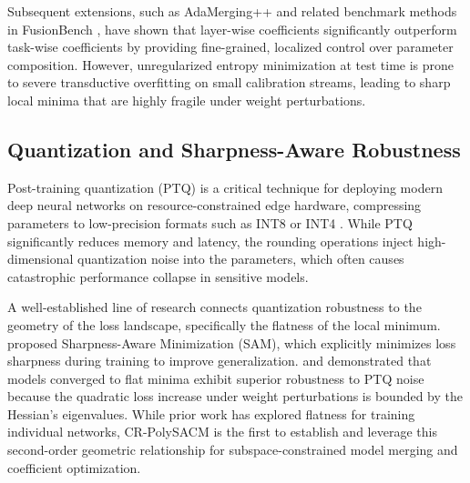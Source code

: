 Subsequent extensions, such as AdaMerging++ and related benchmark methods in FusionBench \cite{fusionbench}, have shown that layer-wise coefficients significantly outperform task-wise coefficients by providing fine-grained, localized control over parameter composition. However, unregularized entropy minimization at test time is prone to severe transductive overfitting on small calibration streams, leading to sharp local minima that are highly fragile under weight perturbations.

\subsection{Quantization and Sharpness-Aware Robustness}
Post-training quantization (PTQ) is a critical technique for deploying modern deep neural networks on resource-constrained edge hardware, compressing parameters to low-precision formats such as INT8 or INT4 \cite{gholami2022survey}. While PTQ significantly reduces memory and latency, the rounding operations inject high-dimensional quantization noise into the parameters, which often causes catastrophic performance collapse in sensitive models.

A well-established line of research connects quantization robustness to the geometry of the loss landscape, specifically the flatness of the local minimum. \citet{sam} proposed Sharpness-Aware Minimization (SAM), which explicitly minimizes loss sharpness during training to improve generalization. \citet{asymmetric_flatness} and \citet{quantization_flatness} demonstrated that models converged to flat minima exhibit superior robustness to PTQ noise because the quadratic loss increase under weight perturbations is bounded by the Hessian's eigenvalues. While prior work has explored flatness for training individual networks, CR-PolySACM is the first to establish and leverage this second-order geometric relationship for subspace-constrained model merging and coefficient optimization.
